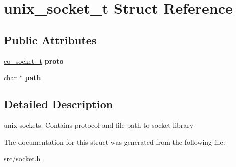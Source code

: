 \hypertarget{structunix__socket__t}{\section{unix\+\_\+socket\+\_\+t Struct Reference}
\label{structunix__socket__t}
}
\subsection*{Public Attributes}
\begin{DoxyCompactItemize}
\item 
\hypertarget{structunix__socket__t_a2d7a292e061c3731747973ae1f97f292}{\hyperlink{structco__socket__t}{co\+\_\+socket\+\_\+t} {\bfseries proto}}\label{structunix__socket__t_a2d7a292e061c3731747973ae1f97f292}

\item 
\hypertarget{structunix__socket__t_a237d9703b3ad03932aea8635e635b043}{char $\ast$ {\bfseries path}}\label{structunix__socket__t_a237d9703b3ad03932aea8635e635b043}

\end{DoxyCompactItemize}


\subsection{Detailed Description}
unix sockets. Contains protocol and file path to socket library 

The documentation for this struct was generated from the following file\+:\begin{DoxyCompactItemize}
\item 
src/\hyperlink{socket_8h}{socket.\+h}\end{DoxyCompactItemize}
